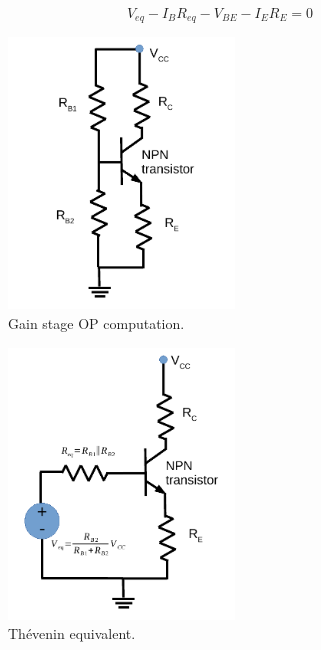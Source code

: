 \begin{equation}
  V_{eq}-I_{B}R_{eq}-V_{BE}-I_{E}R_{E}=0
\end{equation}

\begin{multicols}{2}

  \begin{figure}[H]
  \begin{center}
   \includegraphics[width=6cm]{lab4_DC1.pdf}
  \caption{Gain stage OP computation.}
  \label{fig:DC analysis}
  \end{center}
  \end{figure}
  
  
  \begin{figure}[H]
  \begin{center}
   \includegraphics[width=6cm]{lab4_DC1_TH.pdf}
  \caption{Thévenin equivalent.}
  \label{fig:Thevenin}
  \end{center}
  \end{figure}
\end{multicols}


